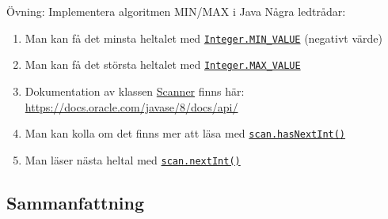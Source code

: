 \documentclass{lecturenotes}
\begin{document}
\begin{Slide}{Övning: Implementera algoritmen MIN/MAX i Java}
\footnotesize
Några ledtrådar:
\begin{enumerate}
\item Man kan få det minsta heltalet med \href{https://docs.oracle.com/javase/8/docs/api/java/lang/Integer.html}{\lstinline{Integer.MIN_VALUE}} (negativt värde)
\item Man kan få det största heltalet med \href{https://docs.oracle.com/javase/8/docs/api/java/lang/Integer.html}{\lstinline{Integer.MAX_VALUE}}
\item Dokumentation av klassen \href{https://docs.oracle.com/javase/8/docs/api/java/util/Scanner.html}{Scanner} finns här: \url{https://docs.oracle.com/javase/8/docs/api/}
\item Man kan kolla om det finns mer att läsa med \href{https://docs.oracle.com/javase/8/docs/api/java/util/Scanner.html#hasNextInt--}{\lstinline{scan.hasNextInt()}}
\item Man läser nästa heltal med  \href{http://docs.oracle.com/javase/8/docs/api/java/util/Scanner.html#nextInt%28%29}{\lstinline{scan.nextInt()}}
\end{enumerate}
\end{Slide}
	
\subsection{Sammanfattning}
\end{document}
